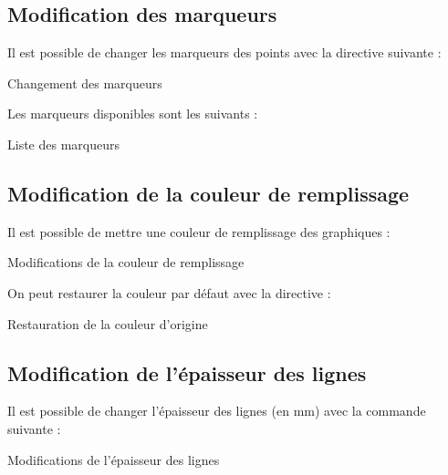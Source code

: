 \subsection{Modification des marqueurs}

Il est possible de changer les marqueurs des points avec la directive suivante : 


\begin{Latex}{Changement des marqueurs}
\setMarker{\markerCircle}
\end{Latex}

Les marqueurs disponibles sont les suivants : \\

\begin{Latex}{Liste des marqueurs}
\markerNone
\markerCircle
\markerSquare
\markerTriangle
\markerDiamond
\markerStart
\end{Latex}

\subsection{Modification de la couleur de remplissage}

Il est possible de mettre une couleur de remplissage des graphiques :

\begin{Latex}{Modifications de la couleur de remplissage}
\end{Latex}

On peut restaurer la couleur par défaut avec la directive : \\

\begin{Latex}{Restauration de la couleur d'origine}
\setDefaultFillColor
\end{Latex}

\subsection{Modification de l'épaisseur des lignes}

Il est possible de changer l'épaisseur des lignes (en mm) avec la commande suivante :

\begin{Latex}{Modifications de l'épaisseur des lignes}
\end{Latex}

